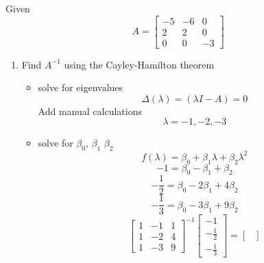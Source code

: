 \item Given
  \begin{equation}
    A = \begin{bmatrix}
-5 & -6 & 0\\
2 & 2 & 0\\
0 & 0 & -3
\end{bmatrix}
\end{equation}
  \begin{enumerate}
  \item Find $A^{-1}$ using the Cayley-Hamilton theorem \\
    \begin{itemize}
    \item solve for eigenvalues \\
      \begin{equation}
        \Delta(\lambda) = (\lambda I - A) = 0
      \end{equation}
      Add manual calculations
      \begin{equation}
        \lambda = -1, -2, -3
      \end{equation}
    \item solve for $\beta_0$, $\beta_1$ $\beta_2$\\
      \begin{equation}
        f(\lambda) = \beta_0 + \beta_1\lambda + \beta_2\lambda^2
      \end{equation}
      \begin{equation}
        -1 = \beta_0 - \beta_1 + \beta_2
      \end{equation}
      \begin{equation}
        -\frac 1 2 = \beta_0 - 2\beta_1 + 4\beta_2
      \end{equation}
      \begin{equation}
        -\frac 1 3 = \beta_0 - 3\beta_1 + 9\beta_2
      \end{equation}
      \begin{equation}
        \begin{bmatrix}
          1 & -1 & 1 \\
          1 & -2 & 4 \\
          1 & -3 & 9
        \end{bmatrix}^{-1}
        \begin{bmatrix}
          -1 \\
          -\frac 1 2 \\
          -\frac 1 3
        \end{bmatrix} =
        \begin{bmatrix}

\end{bmatrix}
\end{equation}
\end{itemize}
\end{enumerate}
